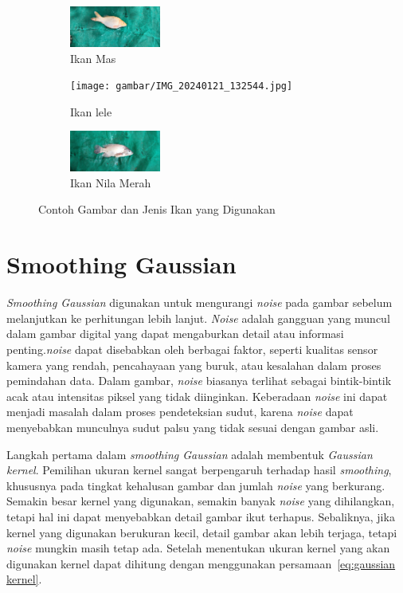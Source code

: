 \begin{figure}
	\centering
	\begin{subfigure}{.3\textwidth}
		\centering
        \includegraphics[keepaspectratio, width=3cm]{gambar/IMG_20240121_131125.jpg}
		\caption{Ikan Mas}
	\end{subfigure}
	\begin{subfigure}{.3\textwidth}
		\centering
		\texttt{[image: gambar/IMG\_20240121\_132544.jpg]}
		\caption{Ikan lele}
	\end{subfigure} 
	\begin{subfigure}{.3\textwidth}
		\centering
		\includegraphics[keepaspectratio, width=3cm]{gambar/IMG_20240121_140044.jpg}
		\caption{Ikan Nila Merah}
	\end{subfigure}
	\caption{Contoh Gambar dan Jenis Ikan yang Digunakan}\label{fig:dataset}
\end{figure}

\section{Smoothing Gaussian}
   \emph{Smoothing Gaussian} digunakan untuk mengurangi \emph{noise} pada gambar sebelum melanjutkan ke perhitungan lebih lanjut.
\emph{Noise} adalah gangguan yang muncul dalam gambar digital yang dapat mengaburkan detail atau informasi penting.\emph{noise} dapat disebabkan oleh berbagai faktor, seperti kualitas sensor kamera yang rendah, pencahayaan yang buruk, atau kesalahan dalam proses pemindahan data.
Dalam gambar, \emph{noise} biasanya terlihat sebagai bintik-bintik acak atau intensitas piksel yang tidak diinginkan. Keberadaan \emph{noise} ini dapat menjadi masalah dalam proses pendeteksian sudut, karena \emph{noise} dapat menyebabkan munculnya sudut palsu yang tidak sesuai dengan gambar asli.
    
    Langkah pertama dalam \emph{smoothing Gaussian} adalah membentuk \emph{Gaussian kernel}. Pemilihan ukuran kernel sangat berpengaruh terhadap hasil \emph{smoothing}, khususnya pada tingkat kehalusan gambar dan jumlah \emph{noise} yang berkurang.
Semakin besar kernel yang digunakan, semakin banyak \emph{noise} yang dihilangkan, tetapi hal ini dapat menyebabkan detail gambar ikut terhapus. Sebaliknya, jika kernel yang digunakan berukuran kecil, detail gambar akan lebih terjaga, tetapi \emph{noise} mungkin masih tetap ada.
Setelah menentukan ukuran kernel yang akan digunakan kernel dapat dihitung dengan menggunakan persamaan~\eqref{eq:gaussian kernel}.

